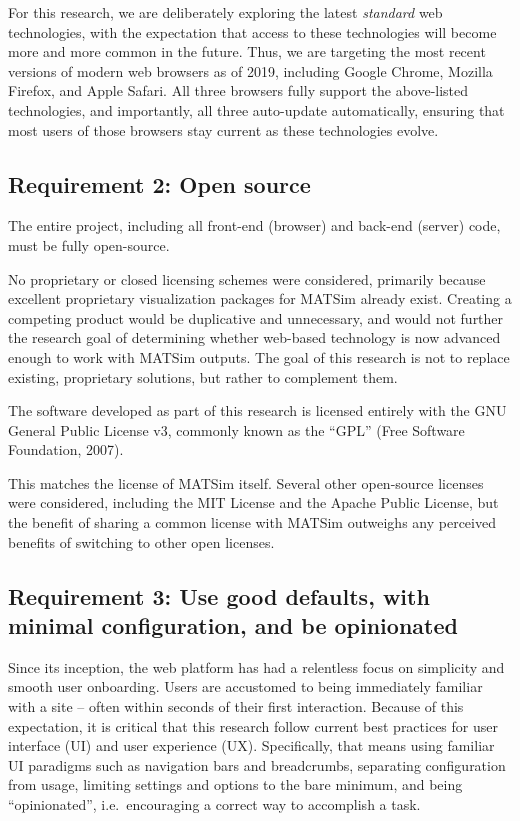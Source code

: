 For this research, we are deliberately exploring the latest \emph{standard} web technologies, with the expectation that access to these technologies will become more and more common in the future. Thus, we are targeting the most recent versions of modern web browsers as of 2019, including Google Chrome, Mozilla Firefox, and Apple Safari. All three browsers fully support the above-listed technologies, and importantly, all three auto-update automatically, ensuring that most users of those browsers stay current as these technologies evolve.

\hypertarget{requirement-2-open-source}{%
\subsection{Requirement 2: Open
source}\label{requirement-2-open-source}}

The entire project, including all front-end (browser) and back-end (server) code, must be fully open-source.

No proprietary or closed licensing schemes were considered, primarily because excellent proprietary visualization packages for MATSim already exist. Creating a competing product would be duplicative and unnecessary, and would not further the research goal of determining whether web-based technology is now advanced enough to work with MATSim outputs. The goal of this research is not to replace existing, proprietary solutions, but rather to complement them.

The software developed as part of this research is licensed entirely with the GNU General Public License v3, commonly known as the ``GPL'' (Free Software Foundation, 2007).

This matches the license of MATSim itself. Several other open-source licenses were considered, including the MIT License and the Apache Public License, but the benefit of sharing a common license with MATSim outweighs any perceived benefits of switching to other open licenses.

\hypertarget{requirement-3-use-good-defaults-with-minimal-configuration-and-be-opinionated}{%
\subsection{Requirement 3: Use good defaults, with minimal configuration, and be opinionated}\label{requirement-3-use-good-defaults-with-minimal-configuration-and-be-opinionated}}

Since its inception, the web platform has had a relentless focus on simplicity and smooth user onboarding. Users are accustomed to being immediately familiar with a site -- often within seconds of their first interaction. Because of this expectation, it is critical that this research follow current best practices for user interface (UI) and user experience (UX). Specifically, that means using familiar UI paradigms such as navigation bars and breadcrumbs, separating configuration from usage, limiting settings and options to the bare minimum, and being ``opinionated'', i.e.~encouraging a correct way to accomplish a task.

